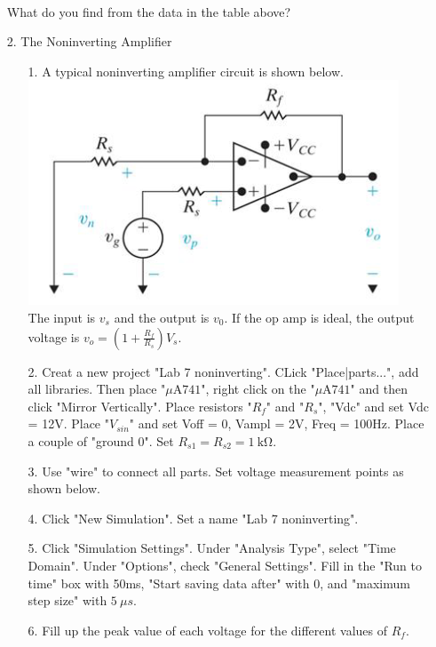 \documentclass[a4paper]{article}
\begin{document}
\begin{itemize}
\begin{tabular}{|l|l|l|l|l|l|l|l|}
	      	\hline
	      \end{tabular} \\
	      What do you find from the data in the table above?
	\item[2.] The Noninverting Amplifier
	      \begin{itemize}
	      	\item[1.] A typical noninverting amplifier circuit is shown below. \\
	      	      \includegraphics{circuit-3.png} \\
	      	      The input is $v_{s}$ and the output is $v_{0}$. If the op amp is ideal, the output voltage is $v_{o} = (1 + \frac{R_{f}}{R_{s}})V_{s}$.
	      	\item[2.] Creat a new project "Lab 7 noninverting". CLick "Place|parts...", add all libraries. Then place "$\si{\mu\ampere}741$", right click on the "$\si{\mu\ampere}741$" and then click "Mirror Vertically". Place resistors "$R_{f}$" and "$R_{s}$", "Vdc" and set Vdc = 12V. Place "$V_{sin}$" and set Voff = 0, Vampl = 2V, Freq = 100Hz. Place a couple of "ground 0". Set $R_{s1} = R_{s2} = \SI{1}{\kilo\ohm}$.
	      	\item[3.] Use "wire" to connect all parts. Set voltage measurement points as shown below.
	      	\item[4.] Click "New Simulation". Set a name "Lab 7 noninverting".
	      	\item[5.] Click "Simulation Settings". Under "Analysis Type", select "Time Domain". Under "Options", check "General Settings". Fill in the "Run to time" box with 50ms, "Start saving data after" with 0, and "maximum step size" with $\SI{5}{\mu}s$.
	      	\item[6.] Fill up the peak value of each voltage for the different values of $R_{f}$.  
	      \end{itemize} 

\end{itemize}
\end{document}
